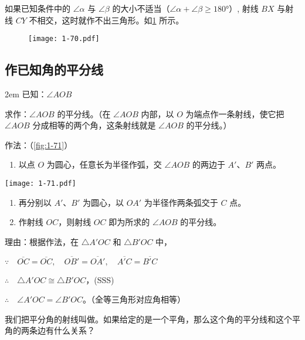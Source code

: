 \begin{rmk}
	如果已知条件中的 $\angle\alpha$ 与 $\angle\beta$ 的大小不适当（$\angle\alpha+\angle \beta\geqslant \ang{180}$）, 射线 $BX$ 与射线 $CY$ 不相交，这时就作不出三角形。如\cref{fig:1-70} 所示。
\end{rmk}
\begin{figure}
	\texttt{[image: 1-70.pdf]}
	\caption{}\label{fig:1-70}
\end{figure}

\subsection{作已知角的平分线}

\noindent\begin{minipage}{0.64\linewidth}\parindent2em
已知：$\angle AOB$

求作：$\angle AOB$ 的平分线。（在 $\angle AOB$ 内部，以 $O$ 为端点作一条射线，使它把 $\angle AOB$ 分成相等的两个角，这条射线就是 $\angle AOB$ 的平分线。）

作法：（\cref{fig:1-71}）
\begin{enumerate}[series=solution]
\item 以点 $O$ 为圆心，任意长为半径作弧，交 $\angle AOB$ 的两边于 $A'$、$B'$ 两点。
\end{enumerate}
\end{minipage}
\begin{minipage}{0.35\linewidth}\centering
	\texttt{[image: 1-71.pdf]}
	\label{fig:1-71}
\end{minipage}

\medskip
\begin{enumerate}[resume=solution]
\item 再分别以 $A'$、$B'$ 为圆心，以 $OA'$ 为半径作两条弧交于 $C$ 点。
\item 作射线 $OC$，则射线 $OC$ 即为所求的 $\angle AOB$ 的平分线。
\end{enumerate}

理由：根据作法，在 $\triangle A'OC$ 和 $\triangle B'OC$ 中，

$\because\quad \overline{OC}=\overline{OC},\quad \overline{OB'}=\overline{OA'},\quad \overline{A'C}=\overline{B'C}$

$\therefore\quad \triangle A'OC\cong \triangle B'OC$，(SSS)

$\therefore\quad \angle A'OC=\angle B'OC$。（全等三角形对应角相等）

\begin{rmk}
我们把平分角的射线叫做。如果给定的是一个平角，那么这个角的平分线和这个平角的两条边有什么关系？
\end{rmk}

